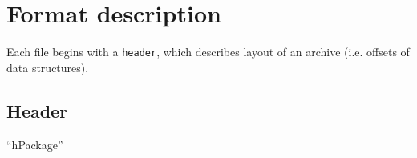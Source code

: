 \documentclass{article}
\begin{document}
\section{Format description}
Each file begins with a \texttt{header}, which describes layout of an archive (i.e. offsets of data structures). 
\subsection{Header}
``hPackage''
\end{document}
